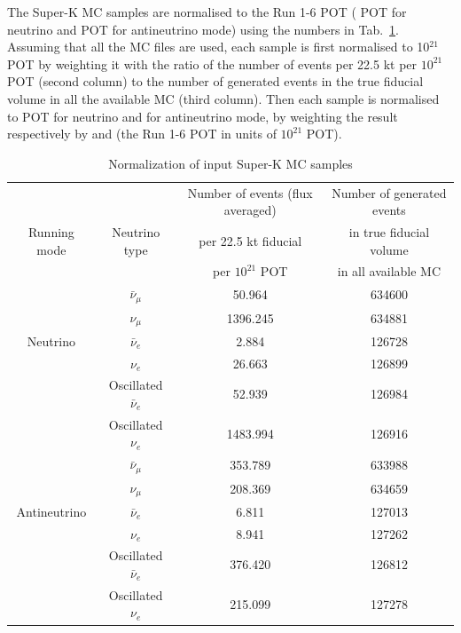 The Super-K MC samples are normalised to the Run 1-6 POT 
(\TotalPotNu{} POT for neutrino and \TotalPotNuBar{} POT for antineutrino mode) 
using the numbers in Tab.~\ref{tab:SKMCNormalisation}. 
Assuming that all the MC files are used, each sample is first normalised to 10$^{21}$ POT by weighting it 
with the ratio of the number of events per 22.5 kt per $10^{21}$ POT (second column) to the number of generated 
events in the true fiducial volume in all the available MC (third column). 
Then each sample is normalised to  
\TotalPotNu{} POT for neutrino and \TotalPotNuBar{} for antineutrino mode,
by weighting the result respectively by 
\TotalPotPerTwentyOneNu{}
and 
\TotalPotPerTwentyOneNuBar{}
(the Run 1-6 POT in units of $10^{21}$ POT). 
\begin{table}
\centering
\begin{tabular}{| c | c | c | c |}
\hline
 				&                       &  Number of events (flux averaged)     & Number of generated events \\
     Running mode     & Neutrino type & per 22.5 kt fiducial 			 & in true fiducial volume    \\
                       	  	&		         & per $10^{21}$ POT     			& in all available MC        \\  
\hline             
	 		&$\bar{\nu}_{\mu}$             &     50.964           &       634600               \\
			&$\nu_{\mu}$                   &     1396.245           &       634881               \\
Neutrino		&$\bar{\nu}_{e}$               &      2.884            &       126728               \\
			&$\nu_{e}$                     &      26.663            &       126899               \\
			&Oscillated $\bar{\nu}_{e}$    &     52.939           &       126984               \\
			&Oscillated $\nu_{e}$          &     1483.994           &       126916               \\
\hline
		 		&$\bar{\nu}_{\mu}$             &     353.789           &       633988               \\
				&$\nu_{\mu}$                   &     208.369           &       634659               \\
Antineutrino		&$\bar{\nu}_{e}$               &      6.811            &       127013               \\
				&$\nu_{e}$                     &      8.941            &       127262               \\
				&Oscillated $\bar{\nu}_{e}$    &     376.420           &       126812               \\
				&Oscillated $\nu_{e}$          &     215.099           &       127278               \\
	
\hline
\end{tabular}
\caption{
  Normalization of input Super-K MC samples \cite{SuperkMC14a}
}
\label{tab:SKMCNormalisation}
\end{table}




